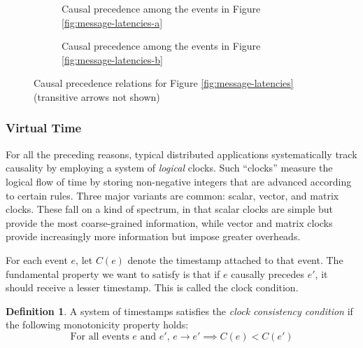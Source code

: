 \documentclass[]             %
{NASA}                       %
\theoremstyle{definition}
\newtheorem{definition}{Definition}[section]
\begin{document}
\begin{figure}[p]
  \setlength\belowcaptionskip{5ex}
  \begin{subfigure}{1\textwidth}
    \centering
    
    \caption{Causal precedence among the events in Figure \ref{fig:message-latencies-a}}
    \label{fig:message-co-a}
  \end{subfigure}
  \begin{subfigure}{1\textwidth}
    \centering
    
    \caption{Causal precedence among the events in Figure \ref{fig:message-latencies-b}}
    \label{fig:message-co-b}
  \end{subfigure}
  \caption{Causal precedence relations for Figure \ref{fig:message-latencies} (transitive arrows not shown)}
  \label{fig:causal-precedence}
\end{figure}

\afterpage{\clearpage}

\subsubsection{Virtual Time}
\label{ssec:timestamps}
For all the preceding reasons, typical distributed applications
systematically track causality by employing a system of \emph{logical}
clocks. Such ``clocks'' measure the logical flow of time by storing
non-negative integers that are advanced according to certain
rules. Three major variants are common: scalar, vector, and matrix
clocks. These fall on a kind of spectrum, in that scalar clocks are
simple but provide the most coarse-grained information, while vector
and matrix clocks provide increasingly more information but impose
greater overheads.

For each event $e$, let $C(e)$ denote the timestamp attached to that
event. The fundamental property we want to satisfy is that if $e$
causally precedes $e'$, it should receive a lesser timestamp. This is
called the clock condition.
\begin{definition}
  A system of timestamps satisfies the \emph{clock consistency
  condition} if the following monotonicity property holds:
  \[ \textrm{For all events $e$ and $e'$, } e \to e' \implies C(e) < C(e') \label{eq:mp}\tag{CC} \]
\end{definition}
\end{document}
